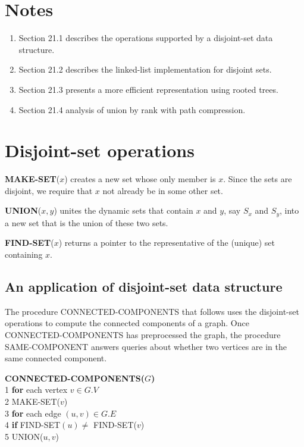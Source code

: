 \section {Notes}

\begin{enumerate}[label=(\roman*)]
\item Section 21.1 describes the operations supported by a disjoint-set data
  structure.
\item Section 21.2 describes the linked-list implementation for disjoint sets.
\item Section 21.3 presents a more efficient representation using rooted trees.
\item Section 21.4 analysis of union by rank with path compression.
\end{enumerate}

\section {Disjoint-set operations}

\textbf{MAKE-SET}($x$) creates a new set whose only member is $x$. Since the
sets are disjoint, we require that $x$ not already be in some other set.

\textbf{UNION}($x, y$) unites the dynamic sets that contain $x$ and $y$, say
$S_x$ and $S_y$, into a new set that is the union of these two sets.

\textbf{FIND-SET}($x$) returns a pointer to the representative of the (unique)
set containing $x$.

\subsection {An application of disjoint-set data structure}

The procedure CONNECTED-COMPONENTS that follows uses the disjoint-set operations
to compute the connected components of a graph. Once CONNECTED-COMPONENTS has
preprocessed the graph, the procedure SAME-COMPONENT answers queries about
whether two vertices are in the same connected component.

\textbf{CONNECTED-COMPONENTS($G$)}\\
1\hspace*{2ex} \textbf{for} each vertex $v \in G.V$\\
2\hspace*{4ex} MAKE-SET($v$)\\
3\hspace*{2ex} \textbf{for} each edge $(u, v) \in G.E$\\
4\hspace*{4ex} \textbf{if} FIND-SET$(u) \neq$ FIND-SET($v$)\\
5\hspace*{6ex} UNION($u, v$)

